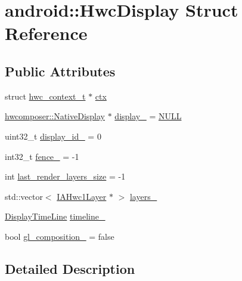 \hypertarget{structandroid_1_1HwcDisplay}{}\section{android\+:\+:Hwc\+Display Struct Reference}
\label{structandroid_1_1HwcDisplay}
\subsection*{Public Attributes}
\begin{DoxyCompactItemize}
\item 
struct \mbox{\hyperlink{structandroid_1_1hwc__context__t}{hwc\+\_\+context\+\_\+t}} $\ast$ \mbox{\hyperlink{structandroid_1_1HwcDisplay_a66a47d55af0cc45dfa51bad548194c9b}{ctx}}
\item 
\mbox{\hyperlink{classhwcomposer_1_1NativeDisplay}{hwcomposer\+::\+Native\+Display}} $\ast$ \mbox{\hyperlink{structandroid_1_1HwcDisplay_a2859906e828a920a80a55f2d251be045}{display\+\_\+}} = \mbox{\hyperlink{alios_2platformdefines_8h_a070d2ce7b6bb7e5c05602aa8c308d0c4}{N\+U\+LL}}
\item 
uint32\+\_\+t \mbox{\hyperlink{structandroid_1_1HwcDisplay_af42dd352ac6360fa0b1a5c5988030b25}{display\+\_\+id\+\_\+}} = 0
\item 
int32\+\_\+t \mbox{\hyperlink{structandroid_1_1HwcDisplay_a169a475fd4c441d9136904190cb76b3d}{fence\+\_\+}} = -\/1
\item 
int \mbox{\hyperlink{structandroid_1_1HwcDisplay_a0c739b9c05495cd8a6bf4d8f2406af9f}{last\+\_\+render\+\_\+layers\+\_\+size}} = -\/1
\item 
std\+::vector$<$ \mbox{\hyperlink{structandroid_1_1IAHwc1Layer}{I\+A\+Hwc1\+Layer}} $\ast$ $>$ \mbox{\hyperlink{structandroid_1_1HwcDisplay_af86b0c8dd4767715caafb550a486b615}{layers\+\_\+}}
\item 
\mbox{\hyperlink{classhwcomposer_1_1DisplayTimeLine}{Display\+Time\+Line}} \mbox{\hyperlink{structandroid_1_1HwcDisplay_ae774424292626edbeaecba6596e8879a}{timeline\+\_\+}}
\item 
bool \mbox{\hyperlink{structandroid_1_1HwcDisplay_a4c3b90194e270884c2c0c995220556e8}{gl\+\_\+composition\+\_\+}} = false
\end{DoxyCompactItemize}


\subsection{Detailed Description}


